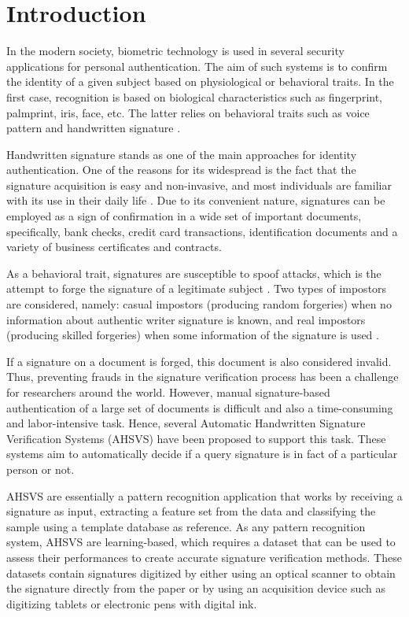 
\chapter{Introduction}
In the modern society, biometric technology is used in several security applications for personal authentication. The aim of such systems is to confirm the identity of a given subject based on physiological or behavioral traits. In the first case, recognition is based on biological characteristics such as fingerprint, palmprint, iris, face, etc. The latter relies on behavioral traits such as voice pattern and handwritten signature \cite{jain2004biometrics}.

Handwritten signature stands as one of the main approaches for identity authentication. One of the reasons for its widespread is the fact that the signature acquisition is easy and non-invasive, and most individuals are familiar with its use in their daily life \cite{impedovo2008state}. Due to its convenient nature, signatures can be employed as a sign of confirmation in a wide set of important documents, specifically, bank checks, credit card transactions, identification documents and a variety of business certificates and contracts.

As a behavioral trait, signatures are susceptible to spoof attacks, which is the attempt to forge the signature of a legitimate subject \cite{jain2004biometrics}. Two types of impostors are considered, namely: casual impostors (producing random forgeries) when no information about authentic writer signature is known, and real impostors (producing skilled forgeries) when some information of the signature is used \cite{fierrez2008handbook}.

If a signature on a document is forged, this document is also considered invalid. Thus, preventing frauds in the signature verification process has been a challenge for researchers around the world. However, manual signature-based authentication of a large set of documents is difficult and also a time-consuming and labor-intensive task. Hence, several Automatic Handwritten Signature Verification Systems (AHSVS) have been proposed to support this task. These systems aim to automatically decide if a query signature is in fact of a particular person or not.

AHSVS are essentially a pattern recognition application that works by receiving a signature as input, extracting a feature set from the data and classifying the sample using a template database as reference. As any pattern recognition system, AHSVS are learning-based, which requires a dataset that can be used to assess their performances to create accurate signature verification methods. These datasets contain signatures digitized by either using an optical scanner to obtain the signature directly from the paper or by using an acquisition device such as digitizing tablets or electronic pens with digital ink.

